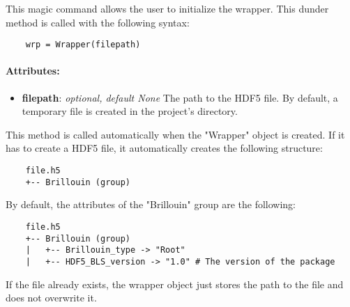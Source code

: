This magic command allows the user to initialize the wrapper. This dunder method is called with the following syntax:
\begin{lstlisting}
    wrp = Wrapper(filepath)
\end{lstlisting}

\paragraph{Attributes:}

\begin{itemize}
    \item \textbf{filepath}: \textit{optional, default None} The path to the HDF5 file. By default, a temporary file is created in the project's directory.
\end{itemize}

This method is called automatically when the "Wrapper" object is created. If it has to create a HDF5 file, it automatically creates the following structure:
\begin{verbatim}
    file.h5
    +-- Brillouin (group)
\end{verbatim}

By default, the attributes of the "Brillouin" group are the following:
\begin{verbatim}
    file.h5
    +-- Brillouin (group)
    |   +-- Brillouin_type -> "Root"
    |   +-- HDF5_BLS_version -> "1.0" # The version of the package
\end{verbatim}

If the file already exists, the wrapper object just stores the path to the file and does not overwrite it.